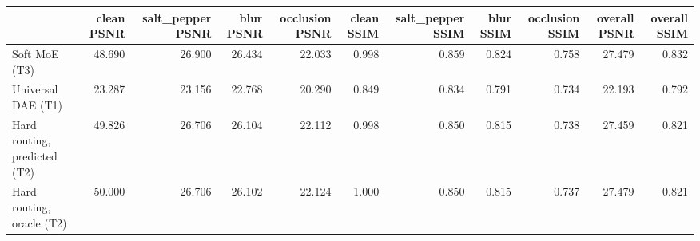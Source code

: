 \begin{tabular}{lrrrrrrrrrr}
\toprule
 & clean PSNR & salt_pepper PSNR & blur PSNR & occlusion PSNR & clean SSIM & salt_pepper SSIM & blur SSIM & occlusion SSIM & overall PSNR & overall SSIM \\
\midrule
Soft MoE (T3) & 48.690 & 26.900 & 26.434 & 22.033 & 0.998 & 0.859 & 0.824 & 0.758 & 27.479 & 0.832 \\
Universal DAE (T1) & 23.287 & 23.156 & 22.768 & 20.290 & 0.849 & 0.834 & 0.791 & 0.734 & 22.193 & 0.792 \\
Hard routing, predicted (T2) & 49.826 & 26.706 & 26.104 & 22.112 & 0.998 & 0.850 & 0.815 & 0.738 & 27.459 & 0.821 \\
Hard routing, oracle (T2) & 50.000 & 26.706 & 26.102 & 22.124 & 1.000 & 0.850 & 0.815 & 0.737 & 27.479 & 0.821 \\
\bottomrule
\end{tabular}
